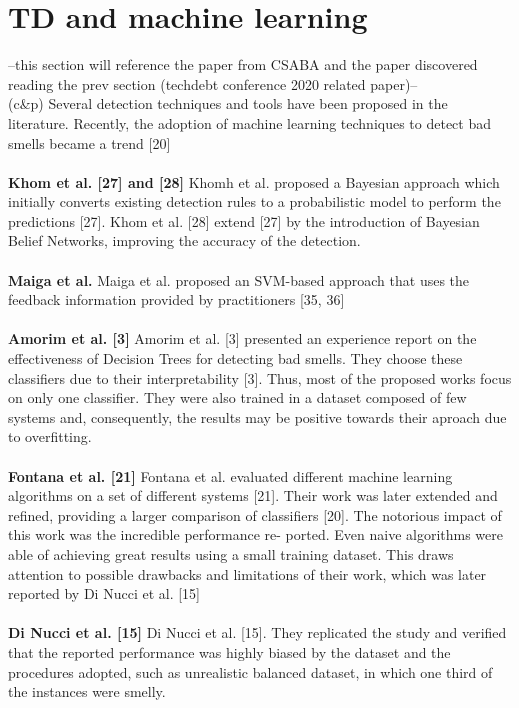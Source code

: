 \section{TD and machine learning}

--this section will reference the paper from CSABA and the paper discovered reading the prev section (techdebt conference 2020 related paper)--
\\
(c\&p) Several detection techniques and tools have been proposed in the literature. Recently, the adoption of machine learning techniques to detect bad smells became a trend [20]
\\
\\
\textbf{Khom et al. [27] and [28]}
Khomh et al. proposed a Bayesian approach which initially converts existing detection rules to a probabilistic model to perform the predictions [27].
Khom et al. [28] extend [27] by the introduction of Bayesian Belief Networks, improving the accuracy of the detection.
\\
\\
\textbf{Maiga et al.}
Maiga et al. proposed an SVM-based approach that uses the feedback information provided by practitioners [35, 36]
\\
\\
\textbf{Amorim et al. [3]}
Amorim et al. [3] presented an experience report on the effectiveness of Decision Trees for detecting bad smells. They choose these classifiers due to their interpretability [3]. Thus, most of the proposed works focus on only one classifier. They were also trained in a dataset composed of few systems and, consequently, the results may be positive towards their aproach due to overfitting.
\\
\\
\textbf{Fontana et al. [21]}
Fontana et al. evaluated different machine learning algorithms on a set of different systems [21]. Their work was later extended and refined, providing a larger comparison of classifiers [20]. The notorious impact of this work was the incredible performance re- ported. Even naive algorithms were able of achieving great results using a small training dataset. This draws attention to possible drawbacks and limitations of their work, which was later reported by Di Nucci et al. [15]
\\
\\
\textbf{Di Nucci et al. [15]}
Di Nucci et al. [15]. They replicated the study and verified that the reported performance was highly biased by the dataset and the procedures adopted, such as unrealistic balanced dataset, in which one third of the instances were smelly.
